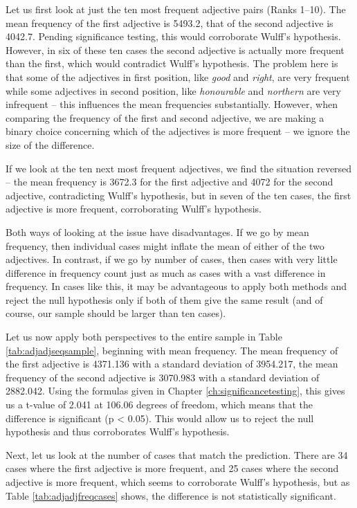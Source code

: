 Let us first look at just the ten most frequent adjective pairs (Ranks 1--10). The mean frequency of the first adjective is 5493.2, that of the second adjective is 4042.7. Pending significance testing, this would corroborate Wulff's hypothesis. However, in six of these ten cases the second adjective is actually more frequent than the first, which would contradict Wulff's hypothesis. The problem here is that some of the adjectives in first position, like \textit{good} and \textit{right}, are very frequent while some adjectives in second position, like \textit{honourable} and \textit{northern} are very infrequent -- this influences the mean frequencies substantially. However, when comparing the frequency of the first and second adjective, we are making a binary choice concerning which of the adjectives is more frequent -- we ignore the size of the difference.

If we look at the ten next most frequent adjectives, we find the situation reversed -- the mean frequency is 3672.3 for the first adjective and 4072 for the second adjective, contradicting Wulff's hypothesis, but in seven of the ten cases, the first adjective is more frequent, corroborating Wulff's hypothesis.

Both ways of looking at the issue have disadvantages. If we go by mean frequency, then individual cases might inflate the mean of either of the two adjectives. In contrast, if we go by number of cases, then cases with very little difference in frequency count just as much as cases with a vast difference in frequency. In cases like this, it may be advantageous to apply both methods and reject the null hypothesis only if both of them give the same result (and of course, our sample should be larger than ten cases).

Let us now apply both perspectives to the entire sample in Table \ref{tab:adjadjseqsample}, beginning with mean frequency. The mean frequency of the first adjective is \num{4371.136} with a standard deviation of \num{3954.217}, the mean frequency of the second adjective is \num{3070.983} with a standard deviation of \num{2882.042}. Using the formulas given in Chapter \ref{ch:significancetesting}, this gives us a t-value of \num{2.041} at \num{106.06} degrees of freedom, which means that the difference is significant (p < 0.05). This would allow us to reject the null hypothesis and thus corroborates Wulff's hypothesis.

Next, let us look at the number of cases that match the prediction. There are 34 cases where the first adjective is more frequent, and 25 cases where the second adjective is more frequent, which seems to corroborate Wulff's hypothesis, but as Table \ref{tab:adjadjfreqcases} shows, the difference is not statistically significant.

